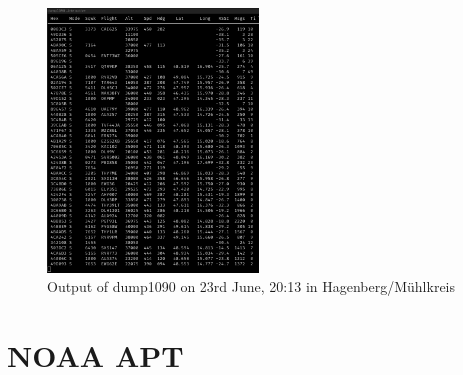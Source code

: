 \documentclass[conference]{IEEEtran}
\begin{document}
\begin{figure}
	\centering
	\caption{Output of dump1090 on 23rd June, 20:13 in Hagenberg/Mühlkreis} \label{fig:dump1090screenshot}
	\includegraphics[width=0.5\textwidth]{dump1090_screenshot}
\end{figure}

\section{NOAA APT} %
\end{document}
